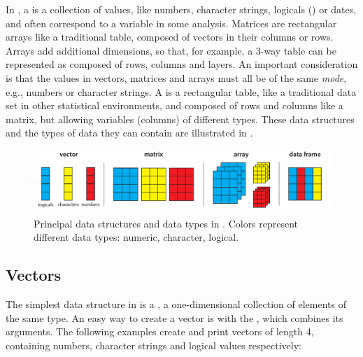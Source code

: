 \documentclass[11pt]{book}
\begin{document}
In \R, a  is a collection of values, like numbers, character strings, logicals () 
or dates, and often correspond to a variable in some analysis.
Matrices are rectangular arrays like a traditional table, composed of vectors in their columns
or rows.  
Arrays add additional dimensions, so that, for example, a 3-way table can be represented
as composed of rows, columns and layers.
An important consideration is that the values in vectors,
matrices and arrays must all be of the same \emph{mode}, e.g., numbers or character strings.
A  is a rectangular table, like a traditional data set in other
statistical environments, and composed of rows and columns like a matrix,
but allowing variables (columns) of different types. These data structures and the types of
data they can contain are illustrated in .

\begin{figure}
\includegraphics[width=\textwidth]{ch02/fig/datatypes2}
\caption[Principal data structures and data types in R]{Principal data structures and data types in \R. Colors
 represent different data types: numeric, character, logical. }
\label{fig:datatypes}
\end{figure}
\subsection{Vectors}
The simplest data structure in \R is a , a one-dimensional
collection of elements of the same type. An easy way to create a vector is with
the , which combines its arguments.  The following examples create
and print vectors of length 4, containing numbers, character strings and
logical values respectively:
\end{document}
